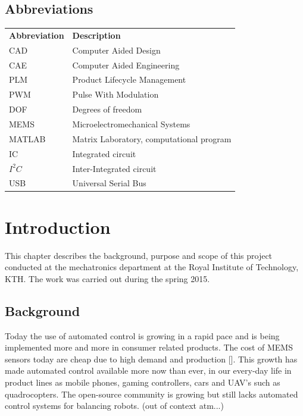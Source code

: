 \documentclass[a4paper,11pt]{kth-mag}
\begin{document}
\section*{Abbreviations}
\noindent{}\begin{tabular}{@{}p{2.5cm}l}
\textbf{Abbreviation} 	& \textbf{Description} \vspace{.5em} \\
CAD			& Computer Aided Design \\
CAE			& Computer Aided Engineering\\
PLM			& Product Lifecycle Management\\
PWM			& Pulse With Modulation\\
DOF			& Degrees of freedom\\
MEMS			& Microelectromechanical Systems \\
MATLAB		& Matrix Laboratory, computational program\\
IC			& Integrated circuit\\
$I^2C$		& Inter-Integrated circuit\\
USB			& Universal Serial Bus \\

\end{tabular}
\cleardoublepage

\mainmatter
\pagestyle{newchap}

\chapter{Introduction}
This chapter describes the background, purpose and scope of this project conducted at the mechatronics department at the Royal Institute of Technology, KTH. The work was carried out during the spring 2015.

\section{Background}
Today the use of automated control is growing in a rapid pace and is being implemented more and more in consumer related products. The cost of MEMS sensors today are cheap due to high demand and production [\cite{MEMSmarket}]. This growth has made automated control available more now than ever, in our every-day life in product lines as mobile phones, gaming controllers, cars and UAV's such as quadrocopters. The  open-source community is growing but still lacks automated control systems for balancing robots. (out of context atm...)
\end{document}
